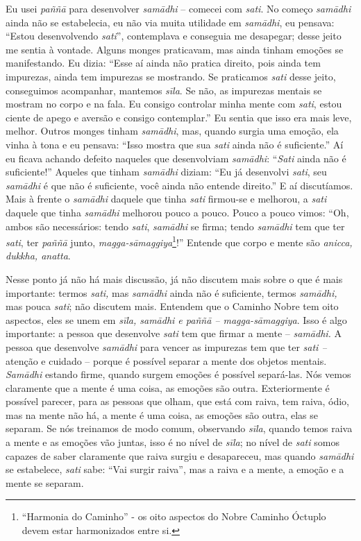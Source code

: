Eu usei \textit{paññ\=a }para desenvolver \textit{sam\=adhi} –
comecei com \textit{sati}. No começo \textit{sam\=adhi} ainda não se
estabelecia, eu não via muita utilidade em \textit{sam\=adhi}, eu
pensava: “Estou desenvolvendo \textit{sati}”, contemplava e conseguia
me desapegar; desse jeito me sentia à vontade. Alguns monges
praticavam, mas ainda tinham emoções se manifestando. Eu dizia: “Esse
aí ainda não pratica direito, pois ainda tem impurezas, ainda tem
impurezas se mostrando. Se praticamos \textit{sati} desse jeito,
conseguimos acompanhar, mantemos \textit{sīla}. Se não, as impurezas
mentais se mostram no corpo e na fala. Eu consigo controlar minha mente
com \textit{sati}, estou ciente de apego e aversão e consigo
contemplar.” Eu sentia que isso era mais leve, melhor. Outros monges
tinham \textit{sam\=adhi}, mas, quando surgia uma emoção, ela vinha à
tona e eu pensava: “Isso mostra que sua \textit{sati} ainda não é
suficiente.” Aí eu ficava achando defeito naqueles que desenvolviam
\textit{sam\=adhi}: “\textit{Sati} ainda não é suficiente!” Aqueles que
tinham \textit{sam\=adhi} diziam: “Eu já desenvolvi \textit{sati}, seu
\textit{sam\=adhi} é que não é suficiente, você ainda não entende
direito.” E aí discutíamos. Mais à frente o \textit{sam\=adhi} daquele
que tinha \textit{sati} firmou-se e melhorou, a \textit{sati} daquele
que tinha \textit{sam\=adhi} melhorou pouco a pouco. Pouco a pouco
vimos: “Oh, ambos são necessários: tendo \textit{sati},
\textit{sam\=adhi} se firma; tendo \textit{sam\=adhi} tem que ter
\textit{sati}, ter \textit{paññ\=a} junto,
\textit{magga-s\=amaggiya}\footnote{“Harmonia do Caminho” - os oito
aspectos do Nobre Caminho Óctuplo devem estar harmonizados entre si.}!”
Entende que corpo e mente são \textit{anicca, dukkha, anatta}. 

Nesse ponto já não há mais discussão, já não discutem mais sobre o
que é mais importante: termos \textit{sati,} mas \textit{sam\=adhi}
ainda não é suficiente, termos \textit{sam\=adhi,} mas pouca
\textit{sati}; não discutem mais. Entendem que o Caminho Nobre tem oito
aspectos, eles se unem em \textit{sīla, sam\=adhi e paññ\=a –
magga-s\=amaggiya}. Isso é algo importante: a pessoa que desenvolve
\textit{sati} tem que firmar a mente – \textit{sam\=adhi. }A pessoa que
desenvolve \textit{sam\=adhi} para vencer as impurezas tem que ter
\textit{sati –} atenção e cuidado – porque é possível separar a mente
dos objetos mentais. \textit{Sam\=adhi} estando firme, quando surgem
emoções é possível separá-las. Nós vemos claramente que a mente é uma
coisa, as emoções são outra. Exteriormente é possível parecer, para as
pessoas que olham, que está com raiva, tem raiva, ódio, mas na mente
não há, a mente é uma coisa, as emoções são outra, elas se separam. Se
nós treinamos de modo comum, observando \textit{sīla}, quando temos
raiva a mente e as emoções vão juntas, isso é no nível de
\textit{sīla}; no nível de \textit{sati} somos capazes de saber
claramente que raiva surgiu e desapareceu, mas quando
\textit{sam\=adhi} se estabelece, \textit{sati} sabe: “Vai surgir
raiva”, mas a raiva e a mente, a emoção e a mente se separam. 

